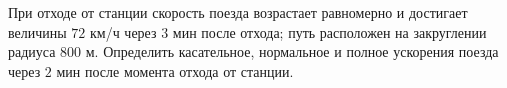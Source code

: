 При отходе от станции скорость поезда возрастает равномерно и
достигает величины $72$ км/ч через $3$ мин после отхода; путь расположен
на закруглении радиуса $800$ м. Определить касательное, нормальное и
полное ускорения поезда через $2$ мин после момента отхода от станции.
